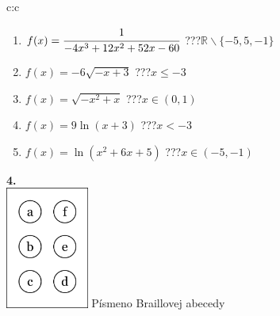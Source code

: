 \documentclass[10pt]{report}
\begin{document}
\begin{tabular}{c:c}
\begin{minipage}[c][99mm][t]{0.49\linewidth}
\begin{center}
\begin{minipage}{0.77\linewidth}
\begin{center}
\begin{varwidth}{\textwidth}
\begin{enumerate}
\item $f(x)=\cfrac{1}{-4x^3+12x^2+52x-60}$\quad \dotfill\; ???\;\dotfill \quad $\mathbb{R}\smallsetminus\{-5,5,-1\}$
\item $f(x)=-6\sqrt{-x+3}$\quad \dotfill\; ???\;\dotfill \quad $x\leq-3$
\item $f(x)=\sqrt{-x^2+x}$\quad \dotfill\; ???\;\dotfill \quad $x\in(0 , 1)$
\item $f(x)=9\ln{(x+3)}$\quad \dotfill\; ???\;\dotfill \quad $x<-3$
\item $f(x)=\ln{(x^2+6x+5)}$\quad \dotfill\; ???\;\dotfill \quad $x\in(-5 , -1)$
\end{enumerate}
\end{varwidth}
\end{center}
\end{minipage}
\begin{minipage}{0.20\linewidth}
\begin{center}
{\Huge\bfseries 4.} \\[2mm]
\includegraphics[height=40mm]{../images/braille.png}
{\small Písmeno Braillovej abecedy}
\end{center}
\end{minipage}
\end{center}
\end{minipage}
%
\end{tabular}
\newpage
\thispagestyle{empty}
\end{document}
